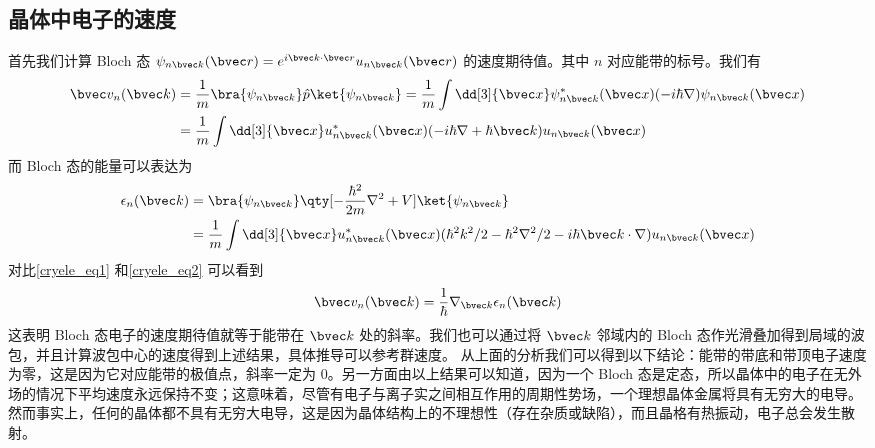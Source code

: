 \subsection{晶体中电子的速度}
首先我们计算 Bloch 态 $\psi_{n\bvec k}(\bvec r)=e^{i\bvec k\cdot \bvec r}u_{n\bvec k}(\bvec r)$ 的速度期待值。其中 $n$ 对应能带的标号。我们有
\begin{equation}\label{cryele_eq1}
\begin{aligned}
\bvec v_n(\bvec k)&=\frac{1}{m}\bra{\psi_{n\bvec k}}\hat p\ket{\psi_{n\bvec k}}=\frac{1}{m}\int \dd[3]{\bvec x}\psi_{n\bvec k}^*(\bvec x)(-i\hbar\nabla)\psi_{n\bvec k}(\bvec x)\\
&=\frac{1}{m}\int \dd[3]{\bvec x}u_{n\bvec k}^*(\bvec x)(-i\hbar\nabla+\hbar \bvec k)u_{n\bvec k}(\bvec x)
\end{aligned}
\end{equation}
而 Bloch 态的能量可以表达为
\begin{equation}\label{cryele_eq2}
\begin{aligned}
\epsilon_{n}(\bvec k)&=\bra{\psi_{n\bvec k}} \qty[-\frac{\hbar^2}{2m}\nabla^2+V]\ket{\psi_{n\bvec k}}
\\&=\frac{1}{m}\int \dd[3]{\bvec x} u_{n\bvec k}^*(\bvec x)(\hbar^2k^2/2-\hbar^2\nabla^2/2-i\hbar\bvec k\cdot \nabla)u_{n\bvec k}(\bvec x)
\end{aligned}
\end{equation}
对比\autoref{cryele_eq1} 和\autoref{cryele_eq2} 可以看到
\begin{equation}\label{cryele_eq3}
\bvec v_n(\bvec k)=\frac{1}{\hbar}\nabla_{\bvec k}\epsilon_{n}(\bvec k)
\end{equation}
这表明 Bloch 态电子的速度期待值就等于能带在 $\bvec k$ 处的斜率。我们也可以通过将 $\bvec k$ 邻域内的 Bloch 态作光滑叠加得到局域的波包，并且计算波包中心的速度得到上述结果，具体推导可以参考群速度。 从上面的分析我们可以得到以下结论：能带的带底和带顶电子速度为零，这是因为它对应能带的极值点，斜率一定为 $0$。另一方面由以上结果可以知道，因为一个 Bloch 态是定态，所以晶体中的电子在无外场的情况下平均速度永远保持不变；这意味着，尽管有电子与离子实之间相互作用的周期性势场，一个理想晶体金属将具有无穷大的电导。然而事实上，任何的晶体都不具有无穷大电导，这是因为晶体结构上的不理想性（存在杂质或缺陷），而且晶格有热振动，电子总会发生散射。
